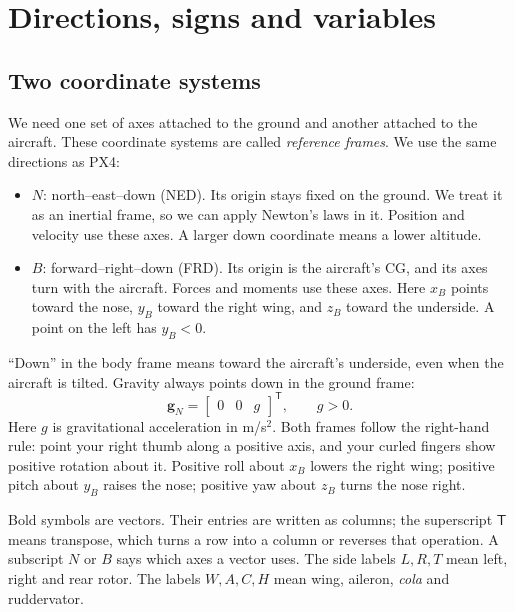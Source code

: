 \documentclass[11pt,a4paper]{article}
\numberwithin{equation}{section}
\newcommand{\vect}[1]{\boldsymbol{#1}}
\newcommand{\trans}{^{\mathsf T}}
\begin{document}
\section{Directions, signs and variables}
\subsection{Two coordinate systems}
We need one set of axes attached to the ground and another attached to the
aircraft. These coordinate systems are called \emph{reference frames}.
We use the same directions as PX4:
\begin{itemize}
  \item $N$: north--east--down (NED). Its origin stays fixed on the ground.
  We treat it as an inertial frame, so we can apply Newton's laws in it.
  Position and velocity use these axes. A larger down coordinate means a
  lower altitude.
  \item $B$: forward--right--down (FRD). Its origin is the aircraft's CG,
  and its axes turn with the aircraft. Forces and moments use these axes.
  Here $x_B$ points toward the nose, $y_B$ toward the right wing, and $z_B$
  toward the underside. A point on the left has $y_B<0$.
\end{itemize}
``Down'' in the body frame means toward the aircraft's underside, even when
the aircraft is tilted. Gravity always points down in the ground frame:
\begin{equation}
  \vect g_N=\begin{bmatrix}0&0&g\end{bmatrix}\trans,\qquad g>0.
\end{equation}
Here $g$ is gravitational acceleration in m/s$^2$.
Both frames follow the right-hand rule: point your right thumb along a
positive axis, and your curled fingers show positive rotation about it.
Positive roll about $x_B$ lowers the right wing; positive pitch about $y_B$
raises the nose; positive yaw about $z_B$ turns the nose right.

Bold symbols are vectors. Their entries are written as columns; the
superscript $\mathsf T$ means transpose, which turns a row into a column or
reverses that operation. A subscript $N$ or $B$ says which axes a vector uses.
The side labels $L,R,T$ mean left, right and rear rotor.
The labels $W,A,C,H$ mean wing, aileron, \emph{cola} and ruddervator.
\end{document}
